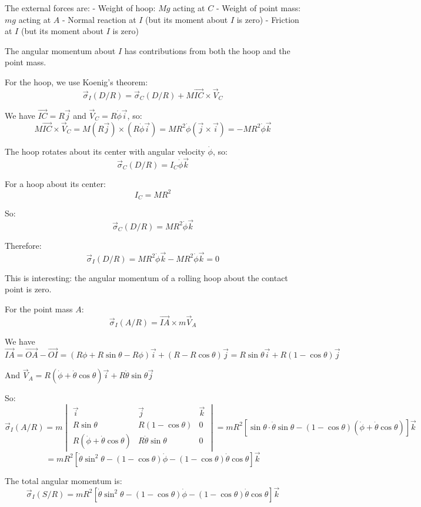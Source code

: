 \documentclass[12pt]{article}
\begin{document}
\begin{correctionbox}
The external forces are:
- Weight of hoop: $Mg$ acting at $C$
- Weight of point mass: $mg$ acting at $A$
- Normal reaction at $I$ (but its moment about $I$ is zero)
- Friction at $I$ (but its moment about $I$ is zero)

The angular momentum about $I$ has contributions from both the hoop and the point mass.

For the hoop, we use Koenig's theorem:
$$\vec{\sigma}_I(D/R) = \vec{\sigma}_C(D/R) + M\vec{IC} \times \vec{V}_C$$

We have $\vec{IC} = R\vec{j}$ and $\vec{V}_C = R\dot{\phi}\vec{i}$, so:
$$M\vec{IC} \times \vec{V}_C = M(R\vec{j}) \times (R\dot{\phi}\vec{i}) = MR^2\dot{\phi}(\vec{j} \times \vec{i}) = -MR^2\dot{\phi}\vec{k}$$

The hoop rotates about its center with angular velocity $\dot{\phi}$, so:
$$\vec{\sigma}_C(D/R) = I_C\dot{\phi}\vec{k}$$

For a hoop about its center:
$$I_C = MR^2$$

So:
$$\vec{\sigma}_C(D/R) = MR^2\dot{\phi}\vec{k}$$

Therefore:
$$\vec{\sigma}_I(D/R) = MR^2\dot{\phi}\vec{k} - MR^2\dot{\phi}\vec{k} = 0$$

This is interesting: the angular momentum of a rolling hoop about the contact point is zero.

For the point mass $A$:
$$\vec{\sigma}_I(A/R) = \vec{IA} \times m\vec{V}_A$$

We have $\vec{IA} = \vec{OA} - \vec{OI} = (R\phi + R\sin\theta - R\phi)\vec{i} + (R - R\cos\theta)\vec{j} = R\sin\theta\vec{i} + R(1 - \cos\theta)\vec{j}$

And $\vec{V}_A = R(\dot{\phi} + \dot{\theta}\cos\theta)\vec{i} + R\dot{\theta}\sin\theta\vec{j}$

So:
$$\vec{\sigma}_I(A/R) = m
\begin{vmatrix}
\vec{i} & \vec{j} & \vec{k} \\
R\sin\theta & R(1 - \cos\theta) & 0 \\
R(\dot{\phi} + \dot{\theta}\cos\theta) & R\dot{\theta}\sin\theta & 0
\end{vmatrix}
= mR^2[\sin\theta \cdot \dot{\theta}\sin\theta - (1 - \cos\theta)(\dot{\phi} + \dot{\theta}\cos\theta)]\vec{k}$$
$$= mR^2[\dot{\theta}\sin^2\theta - (1 - \cos\theta)\dot{\phi} - (1 - \cos\theta)\dot{\theta}\cos\theta]\vec{k}$$

The total angular momentum is:
$$\vec{\sigma}_I(S/R) = mR^2[\dot{\theta}\sin^2\theta - (1 - \cos\theta)\dot{\phi} - (1 - \cos\theta)\dot{\theta}\cos\theta]\vec{k}$$


\end{correctionbox}
\end{document}
